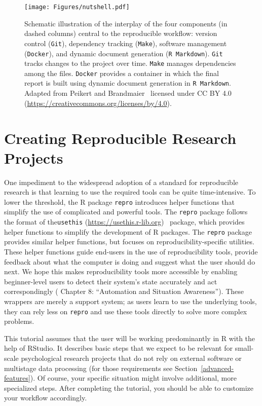 \documentclass[psych,tutorial,accept,moreauthors,pdftex]{Definitions/mdpi}
\begin{document}
\begin{figure}[H]
\texttt{[image: Figures/nutshell.pdf]}
\caption{Schematic illustration of the interplay of the four
components (in dashed columns) central to the reproducible workflow:
version control (\texttt{Git}), dependency tracking (\texttt{Make}),
software management (\texttt{Docker}), and dynamic document generation
(\texttt{R\ Markdown}). \texttt{Git} tracks changes to the project over
time. \texttt{Make} manages dependencies among the files.
\texttt{Docker} provides a container in which the final report is built
using dynamic document generation in \texttt{R\ Markdown}. Adapted from
Peikert and Brandmaier~\citep{Peikert2019} licensed under CC BY 4.0 
(\url{https://creativecommons.org/licenses/by/4.0}).}
\label{figure1}
\end{figure}

\section{Creating Reproducible Research
Projects}\label{creating-reproducible-research-projects}

One impediment to the widespread adoption of a standard for reproducible
research is that learning to use the required tools can be quite
time-intensive. To lower the threshold, the R package \texttt{repro}
introduces helper functions that simplify the use of complicated and
powerful tools. The \texttt{repro} package follows the format of the{\texttt{usethis}} 
 \mbox{(\url{https://usethis.r-lib.org})}~\citep{usethis}
package, which provides helper functions to simplify the development of
R packages. The \texttt{repro} package provides similar helper
functions, but focuses on reproducibility-specific utilities. These
helper functions guide end-users in the use of reproducibility tools,
provide feedback about what the computer is doing and suggest what the
user should do next. We hope this makes reproducibility tools more
accessible by enabling beginner-level users to detect their system's
state accurately and act correspondingly (\citep{parasuramanAutomationHumanPerformance2018} Chapter 8: ``Automation
and Situation Awareness'').
These wrappers are merely a support system; as users learn to use the
underlying tools, they can rely less on \texttt{repro} and use these
tools directly to solve more complex problems.

This tutorial assumes that the user will be working predominantly in R
with the help of RStudio. It describes basic steps that we expect to be
relevant for small-scale psychological research projects that do not
rely on external software or multistage data processing (for those
requirements see Section~\ref{advanced-features}). Of course, your specific situation might involve additional,
more specialized steps. After completing the tutorial, you should be
able to customize your workflow accordingly.
\end{document}
